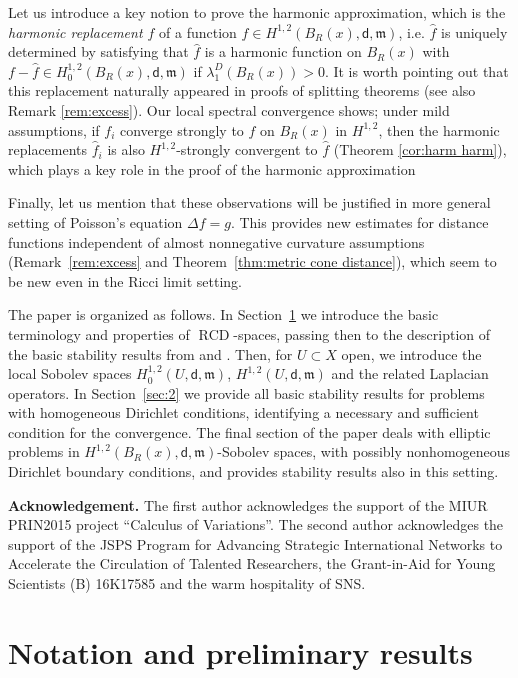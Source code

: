 \documentclass[a4paper,11pt,reqno]{article}
\numberwithin{equation}{section}
\theoremstyle{plain}
\theoremstyle{definition}
\theoremstyle{remark}
\newcommand{\dist}{\mathsf{d}}
\newcommand{\meas}{\mathfrak{m}}
\DeclareMathOperator{\RCD}{RCD}
\begin{document}
Let us introduce a key notion to prove the harmonic approximation, which is the \textit{harmonic replacement $\hat{f}$} of a function $f \in H^{1, 2}(B_R(x), \dist, \meas)$, i.e. $\hat{f}$ is uniquely determined by satisfying that $\hat{f}$ is a harmonic function on $B_R(x)$ with $f-\hat{f} \in H^{1, 2}_0(B_R(x), \dist, \meas)$ if $\lambda_1^D(B_R(x))>0$.
It is worth pointing out that this replacement naturally appeared in proofs of splitting theorems \cite{CheegerGromoll, CheegerColding} (see also Remark \ref{rem:excess}).
Our local spectral convergence shows; under mild assumptions, if $f_i$ converge strongly to $f$ on $B_R(x)$ in $H^{1, 2}$, then the harmonic replacements $\hat{f}_i$ is also $H^{1, 2}$-strongly convergent to $\hat{f}$ (Theorem \ref{cor:harm harm}), which plays a key role in the proof of the harmonic approximation

Finally, let us mention that these observations will be justified in more general setting of Poisson's equation $\Delta f=g$. This
provides new estimates for distance functions independent of almost nonnegative curvature assumptions 
(Remark~\ref{rem:excess} and Theorem~\ref{thm:metric cone distance}), which seem to be new even in the Ricci limit setting.

The paper is organized as follows. In Section~\ref{sec:1} we introduce the basic terminology and properties of $\RCD$-spaces,
passing then to the description of the basic stability results from \cite{GigliMondinoSavare13} and \cite{AmbrosioHonda}.
Then, for $U\subset X$ open, we introduce the local Sobolev spaces $H^{1,2}_0(U,\dist,\meas)$, $H^{1,2}(U,\dist,\meas)$ and the
related Laplacian operators. In Section~\ref{sec:2} we provide all basic stability results for problems with homogeneous
Dirichlet conditions, identifying a necessary and sufficient condition for the convergence. The final section of the paper
deals with elliptic problems in $H^{1,2}(B_R(x),\dist,\meas)$-Sobolev spaces, with possibly nonhomogeneous 
Dirichlet boundary conditions, and provides stability results also in this setting.

\smallskip
{\bf Acknowledgement.} The first author acknowledges the support of the MIUR PRIN2015 project ``Calculus of Variations''. 
The second author acknowledges the support of the JSPS Program for Advancing 
Strategic International Networks to Accelerate the Circulation of Talented Researchers, the
Grant-in-Aid for Young Scientists (B) 16K17585 and the warm hospitality of SNS.


\section{Notation and preliminary results}\label{sec:1}
\end{document}
